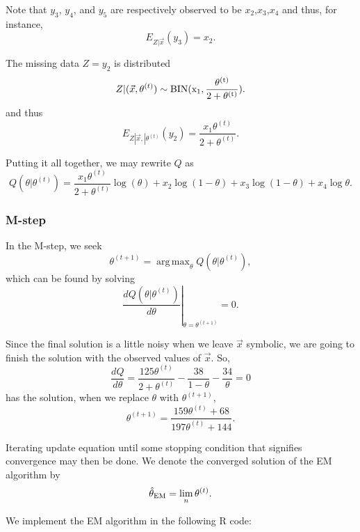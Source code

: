 \documentclass[
]{article}
\begin{document}
Note that \(y_3\), \(y_4\), and \(y_5\) are respectively observed to be
\(x_2\),\(x_3\),\(x_4\) and thus, for instance, \[
  E_{Z|\vec{x}}(y_3) = x_2.
\]

The missing data \(Z = y_2\) is distributed \[
  Z | (\vec{x},\theta^{(t)}) \sim \rm{BIN}(x_1, \frac{\theta^{(t)}}{2+\theta^{(t)}}).
\] and thus \[
  E_{Z|\vec{x},|\theta^{(t)}}(y_2) = \frac{x_1 \theta^{(t)}}{2+\theta^{(t)}}.
\]

Putting it all together, we may rewrite \(Q\) as \[
  Q(\theta|\theta^{(t)}) = \frac{x_1 \theta^{(t)}}{2+\theta^{(t)}} \log(\theta) + x_2 \log(1-\theta) + x_3 \log(1-\theta) + x_4 \log \theta.
\]

\hypertarget{m-step}{%
\subsubsection{M-step}\label{m-step}}

In the M-step, we seek \[
 \theta^{(t+1)} = \operatorname{arg\,max}_{\theta} Q(\theta|\theta^{(t)}),
\] which can be found by solving \[
  \left. \frac{d Q(\theta|\theta^{(t)})}{d \theta} \right\vert_{\theta = \theta^{(t+1)}} = 0.
\]

Since the final solution is a little noisy when we leave \(\vec{x}\)
symbolic, we are going to finish the solution with the observed values
of \(\vec{x}\). So, \[
  \frac{d Q}{d \theta} = \frac{125 \theta^{(t)}}{2+\theta^{(t)}} - \frac{38}{1-\theta}
    - \frac{34}{\theta} = 0
\] has the solution, when we replace \(\theta\) with \(\theta^{(t+1)}\),
\[
  \theta^{(t+1)} = \frac{159 \theta^{(t)} + 68}{197 \theta^{(t)} + 144}.
\]

Iterating update equation until some stopping condition that signifies
convergence may then be done. We denote the converged solution of the EM
algorithm by \[
  \hat\theta_{\rm{EM}} = \lim_n \theta^{(t)}.
\]

We implement the EM algorithm in the following R code:
\end{document}
